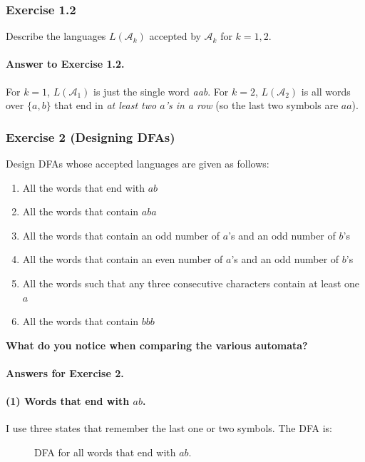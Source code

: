 \documentclass{article}
\theoremstyle{theorem}
\theoremstyle{definition}
\theoremstyle{remark}
\begin{document}
\subsubsection*{Exercise 1.2}
Describe the languages $L(\mathcal{A}_k)$ accepted by $\mathcal{A}_k$ for $k = 1, 2$.

\paragraph{Answer to Exercise 1.2.}
For $k = 1$, $L(\mathcal{A}_1)$ is just the single word \emph{aab}.  
For $k = 2$, $L(\mathcal{A}_2)$ is all words over $\{a,b\}$ that end in \emph{at least two $a$'s in a row} (so the last two symbols are $aa$).

\subsubsection*{Exercise 2 (Designing DFAs)}
Design DFAs whose accepted languages are given as follows:
\begin{enumerate}
  \item All the words that end with $ab$
  \item All the words that contain $aba$
  \item All the words that contain an odd number of $a$'s and an odd number of $b$'s
  \item All the words that contain an even number of $a$'s and an odd number of $b$'s
  \item All the words such that any three consecutive characters contain at least one $a$
  \item All the words that contain $bbb$
\end{enumerate}
\textbf{What do you notice when comparing the various automata?}

\paragraph{Answers for Exercise 2.}

\paragraph{(1) Words that end with $ab$.}
I use three states that remember the last one or two symbols. The DFA is:

\begin{figure}[H]
  \centering
  \caption{DFA for all words that end with $ab$.}
  \label{fig:week1-endab}
\end{figure}
\end{document}
